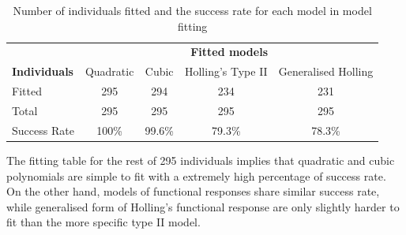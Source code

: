 \documentclass{article}[11pt,a4,twosided,doublespacing,titlepagenumber=on,numbers=endperiod]
\begin{document}
\begin{table}[H]
\centering 
\begin{tabular}{l c c c c}
\toprule %
& \multicolumn{4}{c}{\textbf{Fitted models}} \\
\cmidrule(l){2-5}
\textbf{Individuals} & Quadratic & Cubic & Holling's Type II & Generalised Holling\\ %
\midrule %
Fitted & 295 & 294 & 234 & 231\\ %
Total  & 295 & 295 & 295 & 295\\ %
\midrule %
\midrule %
Success Rate & 100\% & 99.6\% & 79.3\% & 78.3\% \\ %
\bottomrule %
\end{tabular}
\caption{Number of individuals fitted and the success rate for each model in model fitting} %
\label{tab:template} %
\end{table}
\noindent
The fitting table for the rest of 295 individuals implies that quadratic and cubic polynomials are simple to fit with a extremely high percentage of success rate. On the other hand, models of functional responses share similar success rate, while generalised form of Holling's functional response are only slightly harder to fit than the more specific type II model.
\end{document}
